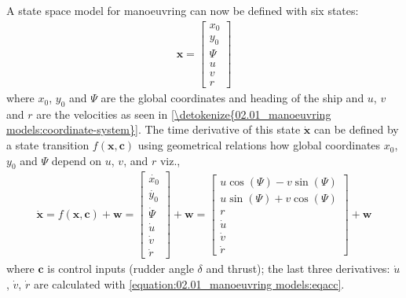 \noindent A state space model for manoeuvring can now be defined with six states:
\begin{equation}\label{equation:02.01_manoeuvring models:eq_x}
\begin{split}\displaystyle \mathbf{x} = \left[\begin{matrix}x_{0}\\y_{0}\\\Psi\\u\\v\\r\end{matrix}\right]\end{split}
\end{equation}
\noindent where $x_0$, $y_0$ and $\Psi$ are the global coordinates and heading of the ship and $u$, $v$ and $r$ are the velocities as seen in \autoref{\detokenize{02.01_manoeuvring models:coordinate-system}}.
The time derivative of this state \(\dot{\mathbf{x}}\) can be defined by a state transition \(f(\mathbf{x},\mathbf{c})\) using geometrical relations
how global coordinates \(x_0\), \(y_0\) and \(\Psi\) depend on \(u\), \(v\), and \(r\) viz.,
\begin{equation}\label{equation:02.01_manoeuvring models:eqf}
\begin{split}\displaystyle \dot{\mathbf{x}} = f(\mathbf{x},\mathbf{c}) + \mathbf{w}
                                          = \left[\begin{matrix}\dot{x_0}\\ \dot{y_0} \\ \dot{\Psi} \\\dot{u}\\\dot{v}\\\dot{r}\end{matrix}\right] + \mathbf{w}
                                          = \left[\begin{matrix}u \cos{\left(\Psi \right)} - v \sin{\left(\Psi \right)}\\u \sin{\left(\Psi \right)} + v \cos{\left(\Psi \right)}\\r\\\dot{u}\\\dot{v}\\\dot{r}\end{matrix}\right] + \mathbf{w}\end{split}
\end{equation}
\sphinxAtStartPar
where \(\mathbf{c}\) is control inputs (rudder angle \(\delta\) and thrust); the last three derivatives: \(\dot{u}\), \(\dot{v}\), \(\dot{r}\) are calculated with \autoref{equation:02.01_manoeuvring models:eqacc}.
